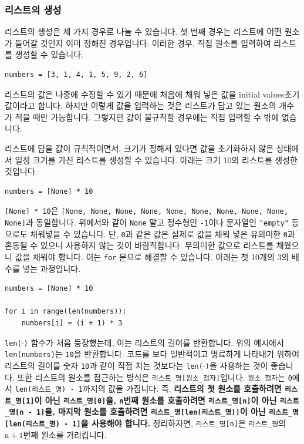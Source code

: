 \documentclass[../main.tex]{subfiles}
\begin{document}
\subsubsection{리스트의 생성}
리스트의 생성은 세 가지 경우로 나눌 수 있습니다.
첫 번째 경우는 리스트에 어떤 원소가 들어갈 것인지 이미 정해진 경우입니다.
이러한 경우, 직접 원소를 입력하여 리스트를 생성할 수 있습니다.
\begin{verbatim}
numbers = [3, 1, 4, 1, 5, 9, 2, 6]
\end{verbatim}
리스트의 값은 나중에 수정할 수 있기 때문에 처음에 채워 넣은 값을 initial values초기값이라고 합니다.
하지만 이렇게 값을 입력하는 것은 리스트가 담고 있는 원소의 개수가 적을 때만 가능합니다.
그렇지만 값이 불규칙할 경우에는 직접 입력할 수 밖에 없습니다.

리스트에 담을 값이 규칙적이면서, 크기가 정해져 있다면 값을 초기화하지 않은 상태에서 일정 크기를 가진 리스트를 생성할 수 있습니다.
아래는 크기 10의 리스트를 생성한 것입니다.
\begin{verbatim}
numbers = [None] * 10
\end{verbatim}
\texttt{[None] * 10}은 \texttt{[None, None, None, None, None, None, None, None, None, None]}과 동일합니다.
위에서와 같이 \texttt{None} 말고 정수형인 \texttt{-1}이나 문자열인 \texttt{"empty"} 등으로도 채워넣을 수 있습니다.
단, \texttt{0}과 같은 값은 실제로 값을 채워 넣은 유의미한 \texttt{0}과 혼동될 수 있으니 사용하지 않는 것이 바람직합니다.
무의미한 값으로 리스트를 채웠으니 값을 채워야 합니다.
이는 \texttt{for} 문으로 해결할 수 있습니다.
아래는 첫 10개의 3의 배수를 넣는 과정입니다.
\begin{verbatim}
numbers = [None] * 10

for i in range(len(numbers)):
	numbers[i] = (i + 1) * 3
\end{verbatim}
\texttt{len($\cdot$)} 함수가 처음 등장했는데, 이는 리스트의 길이를 반환합니다.
위의 예시에서 \texttt{len(numbers)}는 \texttt{10}을 반환합니다.
코드를 보다 일반적이고 명료하게 나타내기 위하여 리스트의 길이를 숫자 \texttt{10}과 같이 직접 치는 것보다는 \texttt{len($\cdot$)}을 사용하는 것이 좋습니다.
또한 리스트의 원소를 접근하는 방식은 \texttt{리스트\_명[원소\_첨자]}입니다.
\texttt{원소\_첨자}는 \texttt{0}에서 \texttt{len(리스트\_명) - 1}까지의 값을 가집니다.
즉, \textbf{리스트의 첫 원소를 호출하려면 \texttt{리스트\_명[1]}이 아닌 \texttt{리스트\_명[0]}을, \texttt{n}번째 원소를 호출하려면 \texttt{리스트\_명[n]}이 아닌 \texttt{리스트\_명[n - 1]}을, 마지막 원소를 호출하려면 \texttt{리스트\_명[len(리스트\_명)]}이 아닌 \texttt{리스트\_명[len(리스트\_명) - 1]}을 사용해야 합니다.}
정리하자면, \texttt{리스트\_명[n]}은 \texttt{리스트\_명}의 $\texttt{n} + 1$번째 원소를 가리킵니다.
\end{document}
